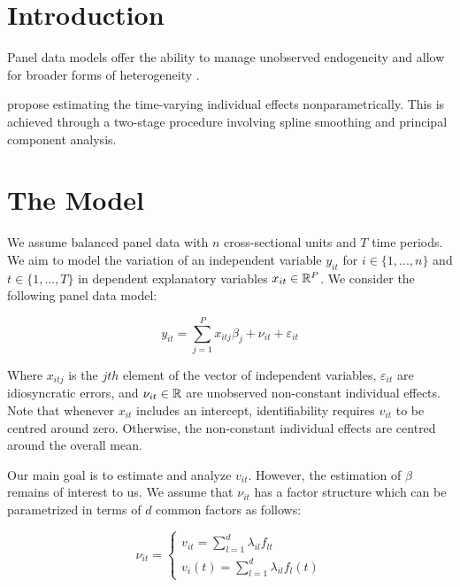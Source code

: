 

\tableofcontents
\clearpage

\section{Introduction}

Panel data models offer the ability to manage unobserved endogeneity and allow for broader forms of heterogeneity \citep{hansen2022econometrics}. 

\citet{kneip2012new} propose estimating the time-varying individual effects nonparametrically. This is achieved through a two-stage procedure involving spline smoothing and principal component analysis. 

\section{The Model}

We assume balanced panel data with $n$ cross-sectional units and $T$ time periods. We aim to model the variation of an independent variable $y_{it}$ for  $i \in \{1, ..., n\}$ and $t \in \{1, ..., T\}$ in dependent explanatory variables $x_{it} \in \mathbb{R}^P$.  We consider the following panel data model:


\begin{equation}\label{model1}
    y_{it} = \sum_{j=1}^P x_{itj}\beta_j + \nu_{it} + \varepsilon_{it}
\end{equation}

Where $x_{itj}$ is the $jth$ element of the vector of independent variables, $\varepsilon_{it}$ are idiosyncratic errors, and $\nu_{it} \in \mathbb{R} $ are unobserved non-constant individual effects. Note that whenever $x_{it}$ includes an intercept, identifiability requires $v_{it}$ to be centred around zero. Otherwise, the non-constant individual effects are centred around the overall mean. 

Our main goal is to estimate and analyze  $v_{it}$. However, the estimation of $\beta$ remains of interest to us. We assume that $\nu_{it}$ has a factor structure which can be parametrized in terms of $d$ common factors as follows:

\begin{equation}\label{factors}
 \nu_{i t}=\left\{\begin{array}{c}v_{i t}=\sum_{l=1}^d \lambda_{i l} f_{l t} \\ v_i(t)=\sum_{l=1}^d \lambda_{i l} f_l(t)\end{array}\right.
\end{equation}


